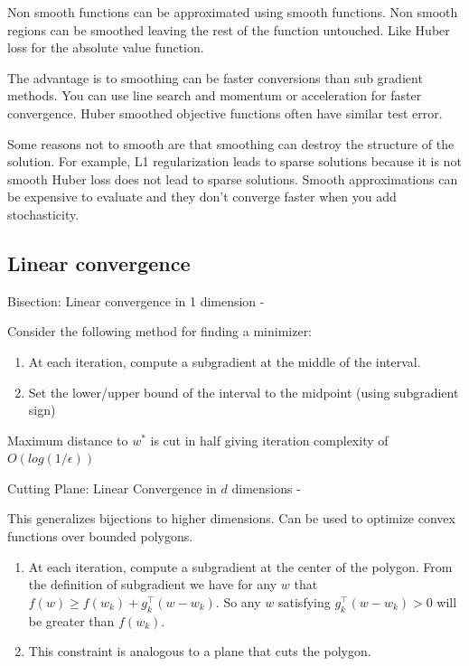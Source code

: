 \documentclass[
]{article}
\providecommand{\tightlist}{%
  \setlength{\itemsep}{0pt}\setlength{\parskip}{0pt}}
\begin{document}
Non smooth functions can be approximated using smooth functions. Non smooth regions can be smoothed leaving the rest of the function untouched. Like Huber loss for the absolute value function.

The advantage is to smoothing can be faster conversions than sub gradient methods. You can use line search and momentum or acceleration for faster convergence. Huber smoothed objective functions often have similar test error.

Some reasons not to smooth are that smoothing can destroy the structure of the solution. For example, L1 regularization leads to sparse solutions because it is not smooth Huber loss does not lead to sparse solutions. Smooth approximations can be expensive to evaluate and they don't converge faster when you add stochasticity.

\subsection{Linear convergence}\label{linear-convergence}

Bisection: Linear convergence in 1 dimension -

Consider the following method for finding a minimizer:

\begin{enumerate}
\def\labelenumi{\arabic{enumi}.}
\tightlist
\item
  At each iteration, compute a subgradient at the middle of the interval.
\item
  Set the lower/upper bound of the interval to the midpoint (using subgradient sign)
\end{enumerate}

Maximum distance to \(w^*\) is cut in half giving iteration complexity of \(O(log(1/\epsilon))\)

Cutting Plane: Linear Convergence in \(d\) dimensions -

This generalizes bijections to higher dimensions. Can be used to optimize convex functions over bounded polygons.

\begin{enumerate}
\def\labelenumi{\arabic{enumi}.}
\item
  At each iteration, compute a subgradient at the center of the polygon. From the definition of subgradient we have for any \(w\) that \(f(w) \geq f(w_k) +g_k^\top (w - w_k)\). So any \(w\) satisfying \(g_k^\top (w - w_k) > 0\) will be greater than \(f(w_k)\).
\item
  This constraint is analogous to a plane that cuts the polygon.
\end{enumerate}
\end{document}
